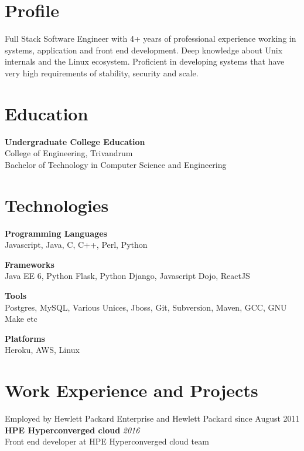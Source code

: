 \documentclass[line,margin]{res}
\begin{document}


\address{joji\_antony@gmx.com}
\address{+91 96323 41954}

\begin{resume}

\section{Profile}
Full Stack Software Engineer with 4+ years of professional experience working in systems, application and front end development. Deep knowledge about Unix internals and the Linux ecosystem. Proficient in developing systems that have very high requirements of stability, security and scale.

\section{Education}
{\bf Undergraduate College Education}\\
College of Engineering, Trivandrum\\
Bachelor of Technology in Computer Science and Engineering\\

\section{Technologies}

{\bf Programming Languages}\\
Javascript, Java, C, C++, Perl, Python

{\bf Frameworks}\\
Java EE 6, Python Flask, Python Django, Javascript Dojo, ReactJS

{\bf Tools}\\
Postgres, MySQL, Various Unices, Jboss, Git, Subversion, Maven, GCC, GNU Make etc

{\bf Platforms}\\
Heroku, AWS, Linux

\section{Work Experience and Projects}

Employed by Hewlett Packard Enterprise and Hewlett Packard since August 2011\\

{\bf HPE Hyperconverged cloud} \hfill {\it{2016}}\\
Front end developer at HPE Hyperconverged cloud team


\end{resume}
\end{document}
